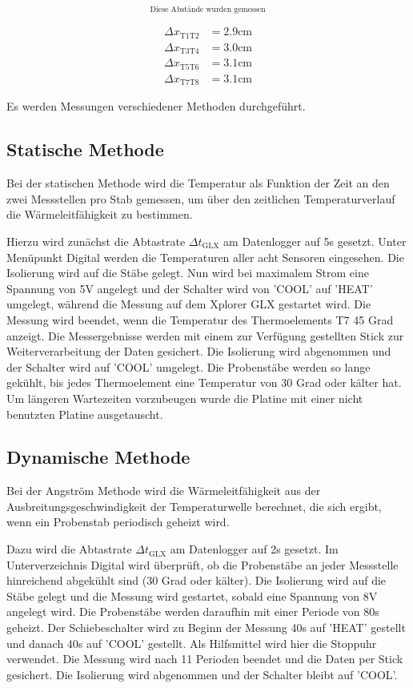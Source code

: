 \begin{equation}
_\text{Diese Abstände wurden gemessen}
\label{eqn:abstand}
\end{equation}

\begin{align*}
    \Delta x_\text{T1T2} &= 2.9 \si{\centi\meter} \\
    \Delta x_\text{T3T4} &= 3.0 \si{\centi\meter} \\
    \Delta x_\text{T5T6} &= 3.1 \si{\centi\meter} \\
    \Delta x_\text{T7T8} &= 3.1 \si{\centi\meter} 
\end{align*}

\noindent Es werden Messungen verschiedener Methoden durchgeführt.

\subsection{Statische Methode}
Bei der statischen Methode wird die Temperatur als Funktion der Zeit an den zwei Messstellen pro Stab gemessen, um über den zeitlichen Temperaturverlauf die Wärmeleitfähigkeit zu bestimmen.

\noindent Hierzu wird zunächst die Abtastrate $\Delta t_\text{GLX}$ am Datenlogger auf 5s gesetzt.
Unter Menüpunkt Digital werden die Temperaturen aller acht Sensoren eingesehen.
Die Isolierung wird auf die Stäbe gelegt.
Nun wird bei maximalem Strom eine Spannung von 5V angelegt und der Schalter wird von 'COOL' auf 'HEAT' umgelegt,
während die Messung auf dem Xplorer GLX gestartet wird.
Die Messung wird beendet, wenn die Temperatur des Thermoelements T7 45 Grad anzeigt.
Die Messergebnisse werden mit einem zur Verfügung gestellten Stick zur Weiterverarbeitung der Daten gesichert.
Die Isolierung wird abgenommen und der Schalter wird auf 'COOL' umgelegt.
Die Probenstäbe werden so lange gekühlt, bis jedes Thermoelement eine Temperatur von 30 Grad oder kälter hat.
Um längeren Wartezeiten vorzubeugen wurde die Platine mit einer nicht benutzten Platine ausgetauscht.

\newpage
\subsection{Dynamische Methode}
Bei der Angström Methode wird die Wärmeleitfähigkeit aus der Ausbreitungsgeschwindigkeit der Temperaturwelle berechnet,
die sich ergibt, wenn ein Probenstab periodisch geheizt wird.

\noindent Dazu wird die Abtastrate $\Delta t_\text{GLX}$ am Datenlogger auf 2s gesetzt.
Im Unterverzeichnis Digital wird überprüft, ob die Probenstäbe an jeder Messstelle hinreichend abgekühlt sind (30 Grad oder kälter).
Die Isolierung wird auf die Stäbe gelegt und die Messung wird gestartet, sobald eine Spannung von 8V angelegt wird.
Die Probenstäbe werden daraufhin mit einer Periode von 80s geheizt.
Der Schiebeschalter wird zu Beginn der Messung 40s auf 'HEAT' gestellt und danach 40s auf 'COOL' gestellt.
Als Hilfsmittel wird hier die Stoppuhr verwendet.
Die Messung wird nach 11 Perioden beendet und die Daten per Stick gesichert.
Die Isolierung wird abgenommen und der Schalter bleibt auf 'COOL'.

